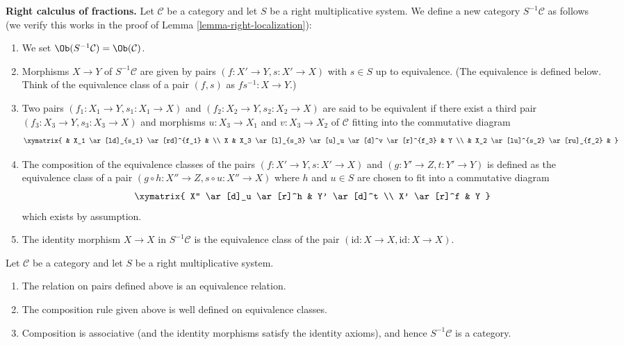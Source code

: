 \noindent
{\bf Right calculus of fractions.}
Let $\mathcal{C}$ be a category and let $S$ be a right multiplicative
system. We define a new category $S^{-1}\mathcal{C}$ as follows
(we verify this works in the proof of
Lemma \ref{lemma-right-localization}):
\begin{enumerate}
\item We set $\Ob(S^{-1}\mathcal{C}) = \Ob(\mathcal{C})$.
\item Morphisms $X \to Y$ of $S^{-1}\mathcal{C}$ are given by pairs
$(f : X' \to Y, s : X' \to X)$ with $s \in S$ up to equivalence.
(The equivalence is defined below. Think of the equivalence class
of a pair $(f, s)$ as $fs^{-1} : X \to Y$.)
\item Two pairs $(f_1 : X_1 \to Y, s_1 : X_1 \to X)$ and
$(f_2 : X_2 \to Y, s_2 : X_2 \to X)$ are said to be equivalent
if there exist a third pair $(f_3 : X_3 \to Y, s_3 : X_3 \to X)$
and morphisms $u : X_3 \to X_1$ and $v : X_3 \to X_2$ of $\mathcal{C}$
fitting into the commutative diagram
$$
\xymatrix{
 & X_1 \ar[ld]_{s_1} \ar[rd]^{f_1} & \\
X &
X_3 \ar[l]_{s_3} \ar[u]_u \ar[d]^v \ar[r]^{f_3} &
Y \\
& X_2 \ar[lu]^{s_2} \ar[ru]_{f_2} &
}
$$
\item The composition of the equivalence classes of the pairs
$(f : X' \to Y, s : X' \to X)$ and $(g : Y' \to Z, t : Y' \to Y)$
is defined as the equivalence class of a pair
$(g \circ h : X'' \to Z, s \circ u : X'' \to X)$
where $h$ and $u \in S$ are chosen to fit into a commutative diagram
$$
\xymatrix{
X'' \ar[d]_u \ar[r]^h & Y' \ar[d]^t \\
X' \ar[r]^f & Y
}
$$
which exists by assumption.
\item The identity morphism $X \to X$ in $S^{-1} \mathcal{C}$ is the
equivalence class of the pair $(\text{id} : X \to X,
\text{id} : X \to X)$.
\end{enumerate}

\begin{lemma}
\label{lemma-right-localization}
Let $\mathcal{C}$ be a category and let $S$ be a right multiplicative
system.
\begin{enumerate}
\item The relation on pairs defined above is an equivalence relation.
\item The composition rule given above is well defined on equivalence
classes.
\item Composition is associative (and the identity morphisms satisfy
the identity axioms), and hence $S^{-1}\mathcal{C}$ is a category.
\end{enumerate}
\end{lemma}


